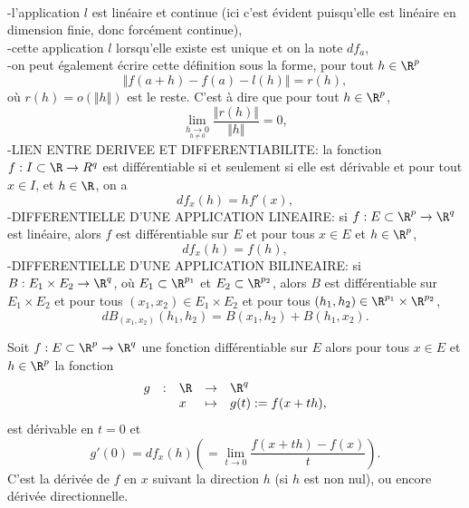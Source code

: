 \documentclass[class=report,crop=false]{standalone}
\begin{document}
 \begin{remarque*}
\textcolor[rgb]{0.00,0.00,1.00}{ \\
-l'application $l$ est linéaire et continue (ici c'est évident puisqu'elle est linéaire en dimension finie, donc forcément continue),\\
-cette application $l$ lorsqu'elle existe est unique et on la note $df_a$,\\
-on peut également écrire cette définition sous la forme, pour tout $h \in \R^p$
\begin{equation*}
\Vert f(a+h)-f(a)-l(h)\Vert=r(h),
\end{equation*}
où $r(h)=o(\Vert h \Vert)$ est le reste. C'est à dire que pour tout $h \in \R^p$, 
\begin{equation*}
\displaystyle \lim_{\underset{h \neq 0}{h\rightarrow 0}}  \dfrac{\Vert r(h)\Vert}{\Vert h \Vert}=0,
\end{equation*}
-LIEN ENTRE DERIVEE ET DIFFERENTIABILITE: la fonction $f: I \subset \R \rightarrow \/R^q$ est différentiable si et seulement si elle est dérivable et pour tout $x \in I$, et $h \in \R$, on a
\begin{equation*}
df_x(h)=hf'(x),
\end{equation*}
-DIFFERENTIELLE D'UNE APPLICATION LINEAIRE: si $f:E \subset \R^p \rightarrow \R^q$ est linéaire, alors $f$ est différentiable sur $E$ et pour tous $x \in E$ et $h \in \R^p$,
\begin{equation*}
df_x(h)=f(h),
\end{equation*} 
-DIFFERENTIELLE D'UNE APPLICATION BILINEAIRE: si $B: E_1 \times E_2 \rightarrow \R^q$,
où $E_1 \subset \R^{p_1}$ et $E_2 \subset \R^{p_2}$, alors $B$ est différentiable sur 
$E_1 \times E_2$ et pour tous $(x_1,x_2) \in E_1 \times E_2$ et pour tous $(h_1,h_2)
\in \R^{p_1} \times \R^{p_2}$,
\begin{equation*}
dB_{(x_1,x_2)}(h_1,h_2)=B(x_1,h_2)+B(h_1,x_2).
\end{equation*} 
}
\end{remarque*}

 \begin{proposition}
\textcolor[rgb]{0.50,0.00,0.25}{
Soit  $f: E \subset \R^p \rightarrow \R^q$ une fonction différentiable sur $E$ alors pour
tous $x \in E$ et $h \in \R^p$ la fonction 
  \begin{equation*}
    \begin{array}{cllll}
      g & : & \R & \rightarrow  & \R^q \\
       & & x  & \mapsto & g(t):=f(x+th),
    \end{array}
  \end{equation*}
est dérivable en $t=0$ et 
\begin{equation*}
g'(0)=df_x(h) (=\displaystyle \lim_{t \rightarrow 0} \dfrac{f(x+th)-f(x)}{t}).
\end{equation*}
C'est la dérivée de $f$ en $x$ suivant la direction $h$ (si $h$ est non nul), ou encore dérivée directionnelle. 
}
\end{proposition}
\end{document}
